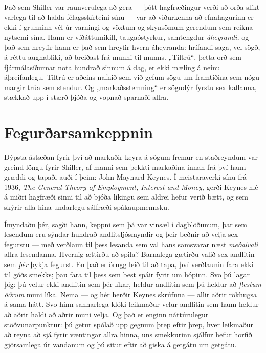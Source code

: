 Það sem Shiller var raunverulega að gera — þótt hagfræðingur verði að orða slíkt varlega til að halda félagsskírteini sínu — var að viðurkenna að efnahagurinn er ekki í grunninn vél úr varningi og vöxtum og skynsömum gerendum sem reikna nytsemi sína. Hann er víðáttumikill, taugaóstyrkur, samtengdur \emph{áheyrandi,} og það sem hreyfir hann er það sem hreyfir hvern áheyranda: hrífandi saga, vel sögð, á réttu augnabliki, að breiðast frá munni til munns. „Tiltrú“, þetta orð sem fjármálasíðurnar nota hundrað sinnum á dag, er ekki mæling á neinu áþreifanlegu. Tiltrú er aðeins nafnið sem við gefum sögu um framtíðina sem nógu margir trúa sem stendur. Og „markaðsstemning“ er sögudýr fyrstu sex kaflanna, stækkað upp í stærð þjóða og vopnað sparnaði allra.

\section*{Fegurðarsamkeppnin}

Dýpsta ástæðan fyrir því að markaðir keyra á sögum fremur en staðreyndum var greind löngu fyrir Shiller, af manni sem þekkti markaðina innan frá því hann græddi og tapaði auði í þeim: John Maynard Keynes. Í meistaraverki sínu frá 1936, \emph{The General Theory of Employment, Interest and Money,} gerði Keynes hlé á miðri hagfræði sinni til að bjóða líkingu sem aldrei hefur verið bætt, og sem skýrir alla hina undarlegu sálfræði spákaupmennsku.

Ímyndaðu þér, sagði hann, keppni sem þá var vinsæl í dagblöðunum, þar sem lesendum eru sýndar hundrað andlitsljósmyndir og þeir beðnir að velja sex fegurstu — með verðlaun til þess lesanda sem val hans samsvarar næst \emph{meðalvali} allra lesendanna. Hvernig ættirðu að spila? Barnalega gætirðu valið sex andlitin sem \emph{þér} þykja fegurst. En það er örugg leið til að tapa, því verðlaunin fara ekki til góðs smekks; þau fara til þess sem best spáir fyrir um hópinn. Svo þú lagar þig: þú velur ekki andlitin sem þér líkar, heldur andlitin sem þú heldur að \emph{flestum öðrum} muni líka. Nema — og hér herðir Keynes skrúfuna — allir aðrir rökhugsa á sama hátt. Svo hinn sannarlega klóki leikmaður velur andlitin sem hann heldur að aðrir haldi að aðrir muni velja. Og það er enginn náttúrulegur stöðvunarpunktur: þú getur spólað upp gegnum þrep eftir þrep, hver leikmaður að reyna að sjá fyrir væntingar allra hinna, uns smekkurinn sjálfur hefur horfið gjörsamlega úr vandanum og þú situr eftir að giska á getgátu um getgátu.

